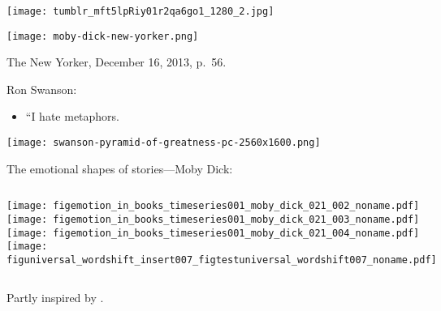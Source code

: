 \begin{frame}
  \frametitle{}

  \texttt{[image: tumblr\_mft5lpRiy01r2qa6go1\_1280\_2.jpg]}
  
\end{frame}

\begin{frame}

  \texttt{[image: moby-dick-new-yorker.png]}

  {\small
    The New Yorker,
    December 16, 2013, p.\ 56.}

\end{frame}

\begin{frame}

  \begin{block}{Ron Swanson:}

    \begin{itemize}
    \item<+->
    ``I hate metaphors. 
    \end{itemize}

  \end{block}
  
\end{frame}

\begin{frame}[plain]

  \texttt{[image: swanson-pyramid-of-greatness-pc-2560x1600.png]}

\end{frame}

\begin{frame}

  \begin{block}{The emotional shapes of stories---Moby Dick:}
    \begin{columns}
      \texttt{[image: figemotion\_in\_books\_timeseries001\_moby\_dick\_021\_002\_noname.pdf]}\\
      \texttt{[image: figemotion\_in\_books\_timeseries001\_moby\_dick\_021\_003\_noname.pdf]}\\
      \texttt{[image: figemotion\_in\_books\_timeseries001\_moby\_dick\_021\_004\_noname.pdf]}
      \texttt{[image: figuniversal\_wordshift\_insert007\_figtestuniversal\_wordshift007\_noname.pdf]}
    \end{columns}
  \end{block}

  \small
  Partly inspired by 
  .
  
\end{frame}


